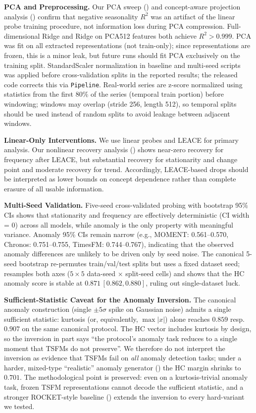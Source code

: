 \documentclass{article}
\begin{document}
\textbf{PCA and Preprocessing.} Our PCA sweep () and concept-aware projection analysis () confirm that negative seasonality $R^2$ was an artifact of the linear probe training procedure, not information loss during PCA compression. Full-dimensional Ridge and Ridge on PCA512 features both achieve $R^2 > 0.999$. PCA was fit on all extracted representations (not train-only); since representations are frozen, this is a minor leak, but future runs should fit PCA exclusively on the training split. StandardScaler normalization in baseline and multi-seed scripts was applied before cross-validation splits in the reported results; the released code corrects this via \texttt{Pipeline}. Real-world series are z-score normalized using statistics from the first 80\% of the series (temporal train portion) before windowing; windows may overlap (stride 256, length 512), so temporal splits should be used instead of random splits to avoid leakage between adjacent windows.

\textbf{Linear-Only Interventions.} We use linear probes and LEACE for primary analysis. Our nonlinear recovery analysis () shows near-zero recovery for frequency after LEACE, but substantial recovery for stationarity and change point and moderate recovery for trend. Accordingly, LEACE-based drops should be interpreted as lower bounds on concept dependence rather than complete erasure of all usable information.

\textbf{Multi-Seed Validation.} Five-seed cross-validated probing with bootstrap 95\% CIs
shows that stationarity and frequency are effectively deterministic (CI width = 0) across all models,
while anomaly is the only property with meaningful variance. Anomaly 95\% CIs remain narrow
(e.g., MOMENT: 0.561--0.570, Chronos: 0.751--0.755, TimesFM: 0.744--0.767), indicating that
the observed anomaly differences are unlikely to be driven only by seed noise. The canonical 5-seed bootstrap re-permutes train/val/test splits but uses a fixed dataset seed;  resamples both axes ($5 \times 5$ data-seed $\times$ split-seed cells) and shows that the HC anomaly score is stable at $0.871\,[0.862,0.880]$, ruling out single-dataset luck.

\textbf{Sufficient-Statistic Caveat for the Anomaly Inversion.} The canonical anomaly construction (single $\pm 5\sigma$ spike on Gaussian noise) admits a single sufficient statistic: kurtosis (or, equivalently, $\max|x|$) alone reaches $0.859$ resp.\ $0.907$ on the same canonical protocol. The HC vector includes kurtosis by design, so the inversion in part says ``the protocol's anomaly task reduces to a single moment that TSFMs do not preserve''. We therefore do not interpret the inversion as evidence that TSFMs fail on \emph{all} anomaly detection tasks; under a harder, mixed-type ``realistic'' anomaly generator () the HC margin shrinks to $0.701$. The methodological point is preserved: even on a kurtosis-trivial anomaly task, frozen TSFM representations cannot decode the sufficient statistic, and a stronger ROCKET-style baseline () extends the inversion to every hard-variant we tested.
\end{document}
